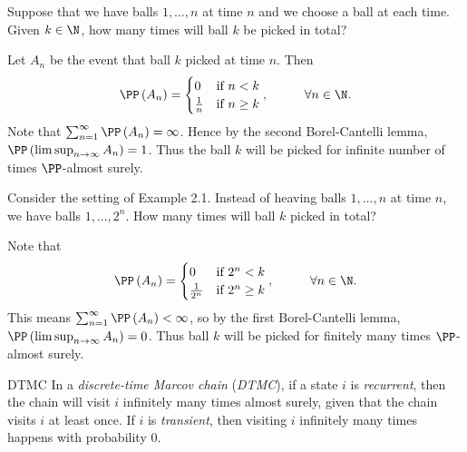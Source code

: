 \documentclass[stat901]{subfiles}
\begin{document}
    \begin{example}{}
        Suppose that we have balls $1,\ldots,n$ at time $n$ and we choose a ball at each time. Given $k\in\N$, how many times will ball $k$ be picked in total?
    \end{example}

    \begin{answer}
        Let $A_n$ be the event that ball $k$ picked at time $n$. Then
        \begin{equation*}
            \PP\left( A_n \right) = 
            \begin{cases} 
                0 & \text{if $n<k$} \\
                \frac{1}{n} & \text{if $n\geq k$}
            \end{cases},\hspace{1cm}\forall n\in\N.
        \end{equation*}
        Note that $\sum^{\infty}_{n=1} \PP\left( A_n \right) = \infty$. Hence by the second Borel-Cantelli lemma, $\PP\left( \limsup_{n\to\infty} A_n \right) = 1$. Thus the ball $k$ will be picked for infinite number of times $\PP$-almost surely.
    \end{answer}

    \clearpage

    \begin{example}{}
        Consider the setting of Example 2.1. Instead of heaving balls $1,\ldots,n$ at time $n$, we have balls $1,\ldots,2^n$. How many times will ball $k$ picked in total?
    \end{example}

    \begin{answer}
        Note that
        \begin{equation*}
            \PP\left( A_n \right) = 
            \begin{cases} 
                0 & \text{if $2^n<k$} \\
                \frac{1}{2^n} & \text{if $2^n\geq k$}
            \end{cases},\hspace{1cm}\forall n\in\N.
        \end{equation*}
        This means $\sum^{\infty}_{n=1}\PP\left( A_n \right)<\infty$, so by the first Borel-Cantelli lemma, $\PP\left( \limsup_{n\to\infty}A_n \right) = 0$. Thus ball $k$ will be picked for finitely many times $\PP$-almost surely.
    \end{answer}
        
    \begin{example}{DTMC}
        In a \textit{discrete-time Marcov chain} (\textit{DTMC}), if a state $i$ is \textit{recurrent}, then the chain will visit $i$ infinitely many times almost surely, given that the chain visits $i$ at least once. If $i$ is \textit{transient}, then visiting $i$ infinitely many times happens with probability $0$.
    \end{example}
        
\end{document}
